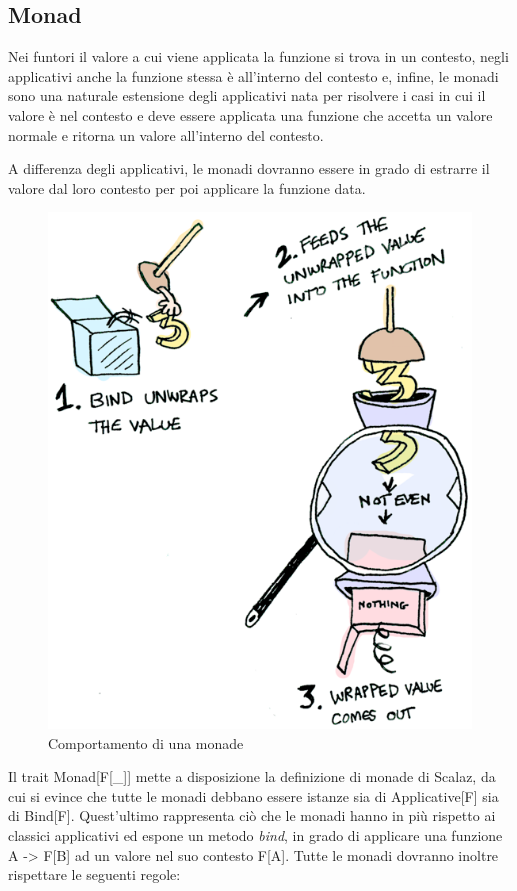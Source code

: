 \subsection{Monad}

Nei funtori il valore a cui viene applicata la funzione si trova in un contesto, negli applicativi anche la funzione stessa è all'interno del contesto e, infine, le monadi sono una naturale estensione degli applicativi nata per risolvere i casi in cui il valore è nel contesto e deve essere applicata una funzione che accetta un valore normale e ritorna un valore all'interno del contesto.

A differenza degli applicativi, le monadi dovranno essere in grado di estrarre il valore dal loro contesto per poi applicare la funzione data.

\begin{figure}[th]
\centering
\includegraphics[scale=0.48]{images/monad}
\decoRule
\caption[monad]{Comportamento di una monade \cite{FunctorsApplicativesMonads}}
\end{figure}

Il trait Monad[F[\_]] mette a disposizione la definizione di monade di Scalaz, da cui si evince che tutte le monadi debbano essere istanze sia di Applicative[F] sia di Bind[F]. Quest'ultimo rappresenta ciò che le monadi hanno in più rispetto ai classici applicativi ed espone un metodo \textit{bind}, in grado di applicare una funzione A -> F[B] ad un valore nel suo contesto F[A]. Tutte le monadi dovranno inoltre rispettare le seguenti regole:

